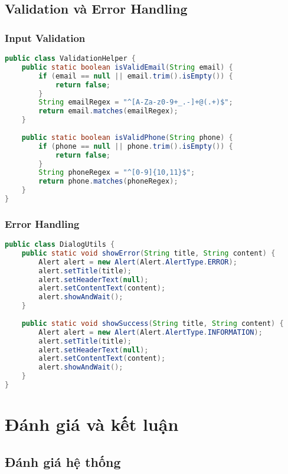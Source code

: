 \documentclass[12pt,a4paper]{article}
\begin{document}
\subsection{Validation và Error Handling}

\subsubsection{Input Validation}

\begin{lstlisting}[language=Java, caption=Ví dụ ValidationHelper]
public class ValidationHelper {
    public static boolean isValidEmail(String email) {
        if (email == null || email.trim().isEmpty()) {
            return false;
        }
        String emailRegex = "^[A-Za-z0-9+_.-]+@(.+)$";
        return email.matches(emailRegex);
    }
    
    public static boolean isValidPhone(String phone) {
        if (phone == null || phone.trim().isEmpty()) {
            return false;
        }
        String phoneRegex = "^[0-9]{10,11}$";
        return phone.matches(phoneRegex);
    }
}
\end{lstlisting}

\subsubsection{Error Handling}

\begin{lstlisting}[language=Java, caption=Ví dụ DialogUtils]
public class DialogUtils {
    public static void showError(String title, String content) {
        Alert alert = new Alert(Alert.AlertType.ERROR);
        alert.setTitle(title);
        alert.setHeaderText(null);
        alert.setContentText(content);
        alert.showAndWait();
    }
    
    public static void showSuccess(String title, String content) {
        Alert alert = new Alert(Alert.AlertType.INFORMATION);
        alert.setTitle(title);
        alert.setHeaderText(null);
        alert.setContentText(content);
        alert.showAndWait();
    }
}
\end{lstlisting}

\section{Đánh giá và kết luận}

\subsection{Đánh giá hệ thống}
\end{document}
